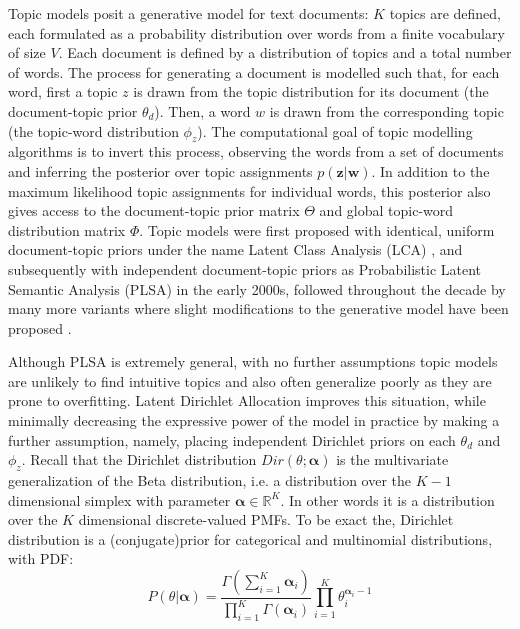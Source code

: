 Topic models posit a generative model for text documents: $K$ topics are defined, each formulated as a probability distribution over words from a finite vocabulary of size $V$. Each document is defined by a distribution of topics and a total number of words. The process for generating a document is modelled such that, for each word, first a topic $z$ is drawn from the topic distribution for its document (the document-topic prior $\theta_d$). Then, a word $w$ is drawn from the corresponding topic (the topic-word distribution $\phi_{z}$). The computational goal of topic modelling algorithms is to invert this process, observing the words from a set of documents and inferring the posterior over topic assignments $p(\boldsymbol{z} | \boldsymbol{w})$. In addition to the maximum likelihood topic assignments for individual words, this posterior also gives access to the document-topic prior matrix $\Theta$ and global topic-word distribution matrix $\Phi$. Topic models were first proposed with identical, uniform document-topic priors under the name Latent Class Analysis (LCA) \citep{Hofmann2000}, and subsequently with independent document-topic priors as Probabilistic Latent Semantic Analysis (PLSA) \citep{Hofmann2001} in the early 2000s, followed throughout the decade by many more variants where slight modifications to the generative model have been proposed \citep{Blei2010}.

Although PLSA is extremely general, with no further assumptions topic models are unlikely to find intuitive topics and also often generalize poorly as they are prone to overfitting. 
Latent Dirichlet Allocation improves this situation, while minimally decreasing the expressive power of the model in practice by making a further assumption, namely, placing independent Dirichlet priors on each $\theta_d$ and $\phi_z$.   Recall that the Dirichlet distribution $Dir(\theta; \boldsymbol{\alpha})$ is the multivariate generalization of the Beta distribution, i.e. a distribution over the $K-1$ dimensional simplex with parameter $\boldsymbol{\alpha} \in \mathbb{R}^K$. In other words  it is a distribution over the $K$ dimensional discrete-valued PMFs.  To be exact the, Dirichlet distribution is a (conjugate)prior for categorical and multinomial distributions, with PDF:  
\begin{equation}
P(\theta|\boldsymbol{\alpha}) = \frac{\Gamma(\sum_{i=1}^{K} \boldsymbol{\alpha}_i)}{\prod_{i=1}^{K} \Gamma(\boldsymbol{\alpha}_i)} \prod_{i=1}^{K} \theta_i^{\boldsymbol{\alpha}_i -1}
\end{equation}

